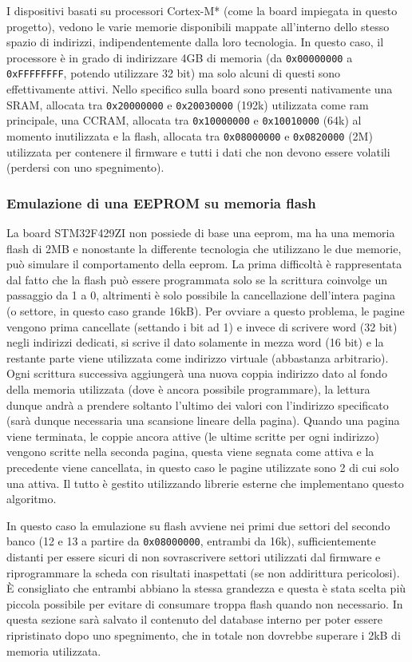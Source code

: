 I dispositivi basati su processori Cortex-M* (come la board impiegata in questo progetto), vedono le varie memorie disponibili mappate all'interno dello stesso spazio di indirizzi, indipendentemente dalla loro tecnologia. In questo caso, il processore \`e in grado di indirizzare 4GB di memoria (da \texttt{0x00000000} a \texttt{0xFFFFFFFF}, potendo utilizzare 32 bit) ma solo alcuni di questi sono effettivamente attivi. Nello specifico sulla board sono presenti nativamente una SRAM, allocata tra \texttt{0x20000000} e \texttt{0x20030000} (192k) utilizzata come ram principale, una CCRAM, allocata tra \texttt{0x10000000} e \texttt{0x10010000} (64k) al momento inutilizzata e la flash, allocata tra \texttt{0x08000000} e \texttt{0x0820000} (2M) utilizzata per contenere il firmware e tutti i dati che non devono essere volatili (perdersi con uno spegnimento).

\subsubsection{Emulazione di una EEPROM su memoria flash}

La board STM32F429ZI non possiede di base una eeprom, ma ha una memoria flash di 2MB e nonostante la differente tecnologia che utilizzano le due memorie, pu\`o simulare il comportamento della eeprom. La prima difficolt\`a \`e rappresentata dal fatto che la flash pu\`o essere programmata solo se la scrittura coinvolge un passaggio da 1 a 0, altrimenti \`e solo possibile la cancellazione dell'intera pagina (o settore, in questo caso grande 16kB). Per ovviare a questo problema, le pagine vengono prima cancellate (settando i bit ad 1) e invece di scrivere word (32 bit) negli indirizzi dedicati, si scrive il dato solamente in mezza word (16 bit) e la restante parte viene utilizzata come indirizzo virtuale (abbastanza arbitrario). Ogni scrittura successiva aggiunger\`a una nuova coppia indirizzo dato al fondo della memoria utilizzata (dove \`e ancora possibile programmare), la lettura dunque andr\`a a prendere soltanto l'ultimo dei valori con l'indirizzo specificato (sar\`a dunque necessaria una scansione lineare della pagina). Quando una pagina viene terminata, le coppie ancora attive (le ultime scritte per ogni indirizzo) vengono scritte nella seconda pagina, questa viene segnata come attiva e la precedente viene cancellata, in questo caso le pagine utilizzate sono 2 di cui solo una attiva. Il tutto \`e gestito utilizzando librerie esterne che implementano questo algoritmo.

In questo caso la emulazione su flash avviene nei primi due settori del secondo banco (12 e 13 a partire da \texttt{0x08000000}, entrambi da 16k), sufficientemente distanti per essere sicuri di non sovrascrivere settori utilizzati dal firmware e riprogrammare la scheda con risultati inaspettati (se non addirittura pericolosi). \`E consigliato che entrambi abbiano la stessa grandezza e questa \`e stata scelta pi\`u piccola possibile per evitare di consumare troppa flash quando non necessario. In questa sezione sar\`a salvato il contenuto del database interno per poter essere ripristinato dopo uno spegnimento, che in totale non dovrebbe superare i 2kB di memoria utilizzata.

